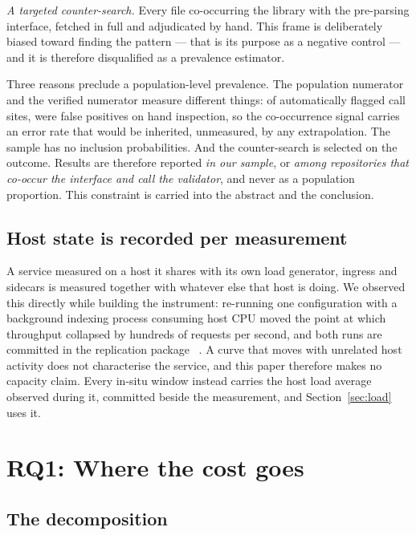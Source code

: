\documentclass[pdflatex,sn-basic,twocolumn]{sn-jnl}%
\providecommand{\DIFaddbegin}{} %
\providecommand{\DIFaddend}{} %
\providecommand{\DIFdelbegin}{} %
\providecommand{\DIFdelend}{} %
\newcommand{\DIFscaledelfig}{0.5}
\newlength{\DIFdelgraphicswidth} %
\newlength{\DIFdelgraphicsheight} %
\newcommand{\DIFaddincludegraphics}[2][]{{\color{blue}\fbox{\DIFOincludegraphics[#1]{#2}}}} %
\newcommand{\DIFdelincludegraphics}[2][]{%
\sbox{\DIFdelgraphicsbox}{\DIFOincludegraphics[#1]{#2}}%
\settoboxwidth{\DIFdelgraphicswidth}{\DIFdelgraphicsbox} %
\settoboxtotalheight{\DIFdelgraphicsheight}{\DIFdelgraphicsbox} %
\scalebox{\DIFscaledelfig}{%
\parbox[b]{\DIFdelgraphicswidth}{\usebox{\DIFdelgraphicsbox}\\[-\baselineskip] \rule{\DIFdelgraphicswidth}{0em}}\llap{\resizebox{\DIFdelgraphicswidth}{\DIFdelgraphicsheight}{%
\setlength{\unitlength}{\DIFdelgraphicswidth}%
\begin{picture}(1,1)%
\thicklines\linethickness{2pt} %
{\color[rgb]{1,0,0}\put(0,0){\framebox(1,1){}}}%
{\color[rgb]{1,0,0}\put(0,0){\line( 1,1){1}}}%
{\color[rgb]{1,0,0}\put(0,1){\line(1,-1){1}}}%
\end{picture}%
}\hspace*{3pt}}} %
} %
\DeclareRobustCommand{\DIFaddbegin}{\DIFOaddbegin \let\includegraphics\DIFaddincludegraphics} %
\DeclareRobustCommand{\DIFaddend}{\DIFOaddend \let\includegraphics\DIFOincludegraphics} %
\DeclareRobustCommand{\DIFdelbegin}{\DIFOdelbegin \let\includegraphics\DIFdelincludegraphics} %
\DeclareRobustCommand{\DIFdelend}{\DIFOaddend \let\includegraphics\DIFOincludegraphics} %
\begin{document}
\emph{A targeted counter-search.} Every file co-occurring the library with the
pre-parsing interface, fetched in full and adjudicated by hand. This frame is
deliberately biased toward finding the pattern --- that is its purpose as a
negative control --- and it is therefore disqualified as a prevalence estimator.

Three reasons preclude a population-level prevalence. The population numerator
and the verified numerator measure different things: of \AdjudicatedTotal{}
automatically flagged call sites, \AdjudicatedFalsePositive{} were false
positives on hand inspection, so the co-occurrence signal carries an error rate
that would be inherited, unmeasured, by any extrapolation. The sample has no
inclusion probabilities. And the counter-search is selected on the outcome.
Results are therefore reported \emph{in our sample}, or \emph{among repositories
that co-occur the interface and call the validator}, and never as a population
proportion. This constraint is carried into the abstract and the conclusion.

\subsection{Host state is recorded per measurement}\label{sec:hoststate}

A service measured on a host it shares with its own load generator, ingress and
sidecars is measured together with whatever else that host is doing. We observed
this directly while building the instrument: re-running one configuration with a
background indexing process consuming host CPU moved the point at which
throughput collapsed by hundreds of requests per second, and both runs are
committed in the replication package~\DIFdelbegin %
\DIFdelend \DIFaddbegin \citep{artifact2026}\DIFaddend . A curve that moves
with unrelated host activity does not characterise the service, and this paper
therefore makes no capacity claim. Every in-situ window instead carries the host
load average observed during it, committed beside the measurement, and
Section~\ref{sec:load} uses it.

\section{RQ1: Where the cost goes}\label{sec:rq1}

\subsection{The decomposition}
\end{document}
